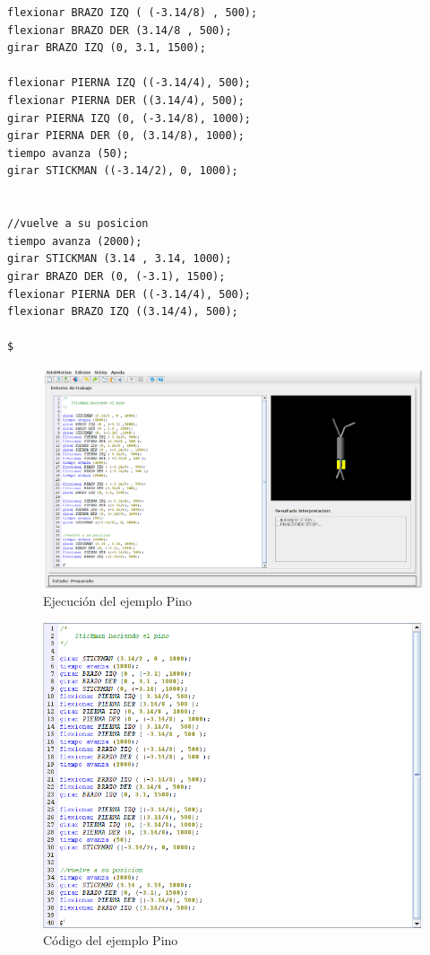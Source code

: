 \documentclass[a4paper, 12pt]{book}
\begin{document}
\begin{itemize}
\begin{verbatim}
flexionar BRAZO IZQ ( (-3.14/8) , 500);
flexionar BRAZO DER (3.14/8 , 500);
girar BRAZO IZQ (0, 3.1, 1500);

flexionar PIERNA IZQ ((-3.14/4), 500);
flexionar PIERNA DER ((3.14/4), 500);
girar PIERNA IZQ (0, (-3.14/8), 1000);
girar PIERNA DER (0, (3.14/8), 1000);
tiempo avanza (50);
girar STICKMAN ((-3.14/2), 0, 1000);


//vuelve a su posicion
tiempo avanza (2000);
girar STICKMAN (3.14 , 3.14, 1000);
girar BRAZO DER (0, (-3.1), 1500);
flexionar PIERNA DER ((-3.14/4), 500);
flexionar BRAZO IZQ ((3.14/4), 500);

$
\end{verbatim}



\begin{figure}[htb]
  \centerline{\includegraphics[width=\textwidth]{./imagenes/pino1.png}}
  \caption{Ejecución del ejemplo Pino}
\end{figure}

\begin{figure}[htb]
  \centerline{\includegraphics[width=\textwidth]{./imagenes/pino1-codigo.png}}
  \caption{Código del ejemplo Pino}
\end{figure}



\end{itemize}
\end{document}
